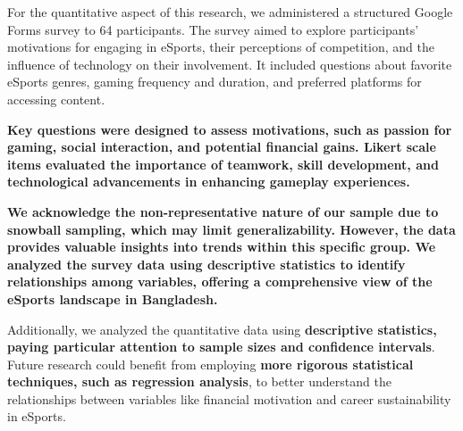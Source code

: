 \documentclass[manuscript,screen,review,anonymous]{acmart}
\begin{document}
For the quantitative aspect of this research, we administered a structured Google Forms survey to 64 participants. The survey aimed to explore participants' motivations for engaging in eSports, their perceptions of competition, and the influence of technology on their involvement. It included questions about favorite eSports genres, gaming frequency and duration, and preferred platforms for accessing content.

\textbf{Key questions were designed to assess motivations, such as passion for gaming, social interaction, and potential financial gains. Likert scale items evaluated the importance of teamwork, skill development, and technological advancements in enhancing gameplay experiences.}

\textbf{We acknowledge the non-representative nature of our sample due to snowball sampling, which may limit generalizability. However, the data provides valuable insights into trends within this specific group. We analyzed the survey data using descriptive statistics to identify relationships among variables, offering a comprehensive view of the eSports landscape in Bangladesh.}

Additionally, we analyzed the quantitative data using \textbf{descriptive statistics, paying particular attention to sample sizes and confidence intervals}. Future research could benefit from employing \textbf{more rigorous statistical techniques, such as regression analysis}, to better understand the relationships between variables like financial motivation and career sustainability in eSports.


\end{document}
